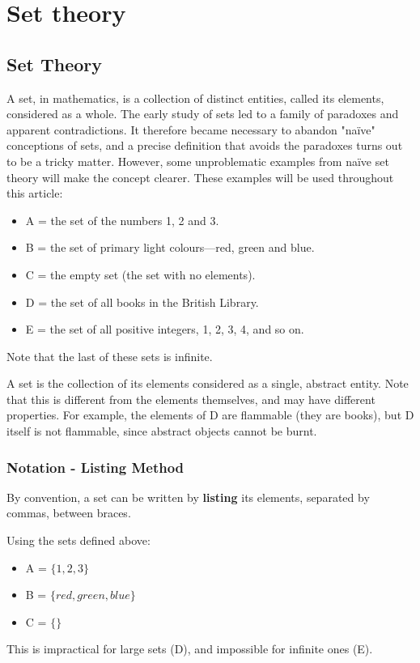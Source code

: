 \documentclass[]{report}
\begin{document}
\chapter{Set theory}



\section{Set Theory}
A set, in mathematics, is a collection of distinct entities, called its elements, considered as a whole. The early study of sets led to a family of paradoxes and apparent contradictions. It therefore became necessary to abandon "naïve" conceptions of sets, and a precise definition that avoids the paradoxes turns out to be a tricky matter. However, some unproblematic examples from naïve set theory will make the concept clearer. These examples will be used throughout this article:

\begin{itemize}
	\item A = the set of the numbers 1, 2 and 3.
	\item B = the set of primary light colours—red, green and blue.
	\item C = the empty set (the set with no elements).
	\item D = the set of all books in the British Library.
	\item E = the set of all positive integers, 1, 2, 3, 4, and so on.
\end{itemize}

Note that the last of these sets is infinite.

A set is the collection of its elements considered as a single, abstract entity. Note that this is different from the elements themselves, and may have different properties. For example, the elements of D are flammable (they are books), but D itself is not flammable, since abstract objects cannot be burnt.

\subsection{Notation - Listing Method}

By convention, a set can be written by \textbf{listing} its elements, separated by commas, between {braces}. 

Using the sets defined above:
\begin{itemize}
	\item A = $\{1, 2, 3\}$
	\item B = $\{red, green, blue\}$
	\item C = $\{\}$
\end{itemize}
This is impractical for large sets (D), and impossible for infinite ones (E). 
\end{document}
